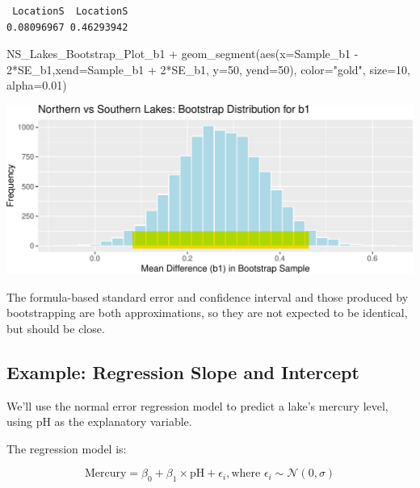 \documentclass[
  letterpaper,
  DIV=11,
  numbers=noendperiod]{scrreprt}
\newenvironment{Shaded}{\begin{snugshade}}{\end{snugshade}}
\newcommand{\AttributeTok}[1]{\textcolor[rgb]{0.40,0.45,0.13}{#1}}
\newcommand{\DecValTok}[1]{\textcolor[rgb]{0.68,0.00,0.00}{#1}}
\newcommand{\FloatTok}[1]{\textcolor[rgb]{0.68,0.00,0.00}{#1}}
\newcommand{\FunctionTok}[1]{\textcolor[rgb]{0.28,0.35,0.67}{#1}}
\newcommand{\NormalTok}[1]{\textcolor[rgb]{0.00,0.23,0.31}{#1}}
\newcommand{\SpecialCharTok}[1]{\textcolor[rgb]{0.37,0.37,0.37}{#1}}
\newcommand{\StringTok}[1]{\textcolor[rgb]{0.13,0.47,0.30}{#1}}
\begin{document}
\begin{verbatim}
 LocationS  LocationS 
0.08096967 0.46293942 
\end{verbatim}

\begin{Shaded}
\begin{Highlighting}[]
\NormalTok{NS\_Lakes\_Bootstrap\_Plot\_b1 }\SpecialCharTok{+} 
  \FunctionTok{geom\_segment}\NormalTok{(}\FunctionTok{aes}\NormalTok{(}\AttributeTok{x=}\NormalTok{Sample\_b1 }\SpecialCharTok{{-}} \DecValTok{2}\SpecialCharTok{*}\NormalTok{SE\_b1,}\AttributeTok{xend=}\NormalTok{Sample\_b1 }\SpecialCharTok{+} \DecValTok{2}\SpecialCharTok{*}\NormalTok{SE\_b1, }\AttributeTok{y=}\DecValTok{50}\NormalTok{, }\AttributeTok{yend=}\DecValTok{50}\NormalTok{), }
               \AttributeTok{color=}\StringTok{"gold"}\NormalTok{, }\AttributeTok{size=}\DecValTok{10}\NormalTok{, }\AttributeTok{alpha=}\FloatTok{0.01}\NormalTok{) }
\end{Highlighting}
\end{Shaded}

\includegraphics{Ch4_files/figure-pdf/unnamed-chunk-20-1.pdf}

The formula-based standard error and confidence interval and those
produced by bootstrapping are both approximations, so they are not
expected to be identical, but should be close.

\subsection{Example: Regression Slope and
Intercept}\label{example-regression-slope-and-intercept}

We'll use the normal error regression model to predict a lake's mercury
level, using pH as the explanatory variable.

The regression model is:

\[
\text{Mercury} = \beta_0 +\beta_1 \times\text{pH} + \epsilon_i, \text{where } \epsilon_i\sim\mathcal{N}(0, \sigma) 
\]
\end{document}
